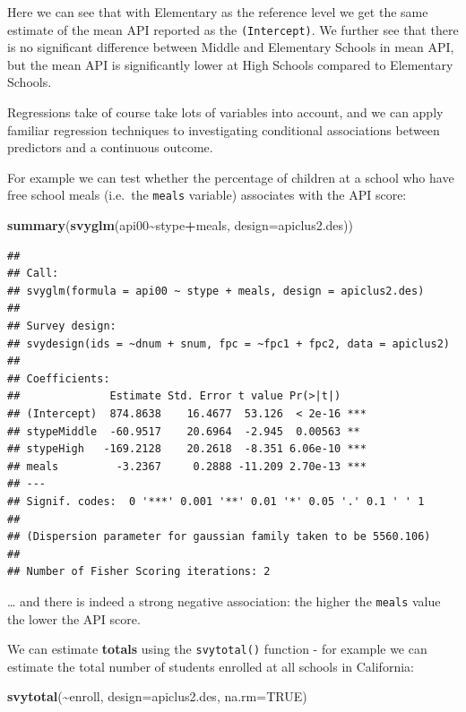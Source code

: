 \documentclass[
]{book}
\newenvironment{Shaded}{\begin{snugshade}}{\end{snugshade}}
\newcommand{\AttributeTok}[1]{\textcolor[rgb]{0.13,0.29,0.53}{#1}}
\newcommand{\ConstantTok}[1]{\textcolor[rgb]{0.56,0.35,0.01}{#1}}
\newcommand{\FunctionTok}[1]{\textcolor[rgb]{0.13,0.29,0.53}{\textbf{#1}}}
\newcommand{\NormalTok}[1]{#1}
\newcommand{\SpecialCharTok}[1]{\textcolor[rgb]{0.81,0.36,0.00}{\textbf{#1}}}
\begin{document}
Here we can see that with Elementary as the reference level we
get the same estimate of the mean API reported as the \texttt{(Intercept)}.
We further see that there is no significant difference between Middle
and Elementary Schools in mean API, but the mean API is significantly lower
at High Schools compared to Elementary Schools.

Regressions take of course take lots of variables into account, and
we can apply familiar regression techniques to investigating
conditional associations between predictors and a continuous outcome.

For example we can test whether the percentage of children at a school
who have free school meals (i.e.~the \texttt{meals} variable) associates with the
API score:

\begin{Shaded}
\begin{Highlighting}[]
\FunctionTok{summary}\NormalTok{(}\FunctionTok{svyglm}\NormalTok{(api00}\SpecialCharTok{\textasciitilde{}}\NormalTok{stype}\SpecialCharTok{+}\NormalTok{meals, }\AttributeTok{design=}\NormalTok{apiclus2.des))}
\end{Highlighting}
\end{Shaded}

\begin{verbatim}
## 
## Call:
## svyglm(formula = api00 ~ stype + meals, design = apiclus2.des)
## 
## Survey design:
## svydesign(ids = ~dnum + snum, fpc = ~fpc1 + fpc2, data = apiclus2)
## 
## Coefficients:
##              Estimate Std. Error t value Pr(>|t|)    
## (Intercept)  874.8638    16.4677  53.126  < 2e-16 ***
## stypeMiddle  -60.9517    20.6964  -2.945  0.00563 ** 
## stypeHigh   -169.2128    20.2618  -8.351 6.06e-10 ***
## meals         -3.2367     0.2888 -11.209 2.70e-13 ***
## ---
## Signif. codes:  0 '***' 0.001 '**' 0.01 '*' 0.05 '.' 0.1 ' ' 1
## 
## (Dispersion parameter for gaussian family taken to be 5560.106)
## 
## Number of Fisher Scoring iterations: 2
\end{verbatim}

\ldots{} and there is indeed a strong negative association: the higher the
\texttt{meals} value the lower the API score.

We can estimate \textbf{totals} using the \texttt{svytotal()} function - for example
we can estimate the total number of students enrolled at all schools in
California:

\begin{Shaded}
\begin{Highlighting}[]
\FunctionTok{svytotal}\NormalTok{(}\SpecialCharTok{\textasciitilde{}}\NormalTok{enroll, }\AttributeTok{design=}\NormalTok{apiclus2.des, }\AttributeTok{na.rm=}\ConstantTok{TRUE}\NormalTok{)}
\end{Highlighting}
\end{Shaded}
\end{document}
